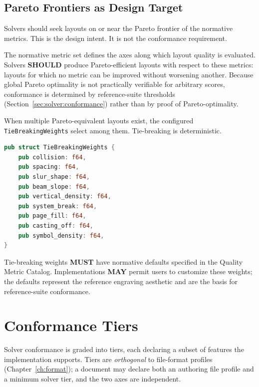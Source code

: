 \documentclass[11pt,letterpaper]{report}
\newcounter{requirement}[chapter]
\newcommand{\MUST}{\textbf{MUST}}
\newcommand{\SHOULD}{\textbf{SHOULD}}
\newcommand{\MAY}{\textbf{MAY}}
\begin{document}
\subsection{Pareto Frontiers as Design Target}

Solvers should seek layouts on or near the Pareto frontier of the
normative metrics. This is the design intent. It is not the
conformance requirement.

\begin{requirement}
  \label{req:solver:pareto-efficiency}
  The normative metric set defines the axes along which layout
  quality is evaluated. Solvers \SHOULD{} produce Pareto-efficient
  layouts with respect to these metrics: layouts for which no
  metric can be improved without worsening another. Because global
  Pareto optimality is not practically verifiable for arbitrary
  scores, conformance is determined by reference-suite thresholds
  (Section~\ref{sec:solver:conformance}) rather than by proof of
  Pareto-optimality.

  When multiple Pareto-equivalent layouts exist, the configured
  \texttt{TieBreakingWeights} select among them. Tie-breaking is
  deterministic.
\end{requirement}

\begin{lstlisting}[language=Rust]
pub struct TieBreakingWeights {
    pub collision: f64,
    pub spacing: f64,
    pub slur_shape: f64,
    pub beam_slope: f64,
    pub vertical_density: f64,
    pub system_break: f64,
    pub page_fill: f64,
    pub casting_off: f64,
    pub symbol_density: f64,
}
\end{lstlisting}

\begin{requirement}
  \label{req:solver:tie-breaking-weight-defaults}
  Tie-breaking weights \MUST{} have normative defaults specified
  in the Quality Metric Catalog. Implementations \MAY{} permit
  users to customize these weights; the defaults represent the
  reference engraving aesthetic and are the basis for
  reference-suite conformance.
\end{requirement}

\section{Conformance Tiers}
\label{sec:solver:tiers}

Solver conformance is graded into tiers, each declaring a subset
of features the implementation supports. Tiers are \emph{orthogonal}
to file-format profiles (Chapter~\ref{ch:format}); a document may
declare both an authoring file profile and a minimum solver tier,
and the two axes are independent.
\end{document}
